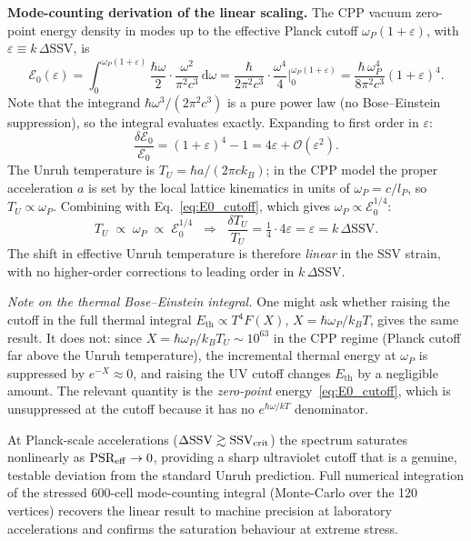 \documentclass[11pt,letterpaper]{article}
\begin{document}
\textbf{Mode-counting derivation of the linear scaling.}
The CPP vacuum zero-point energy density in modes up to the 
effective Planck cutoff $\omega_P(1+\varepsilon)$, with
$\varepsilon \equiv k\,\Delta\mathrm{SSV}$, is
\begin{equation}
  \mathcal{E}_0(\varepsilon)
  = \int_0^{\omega_P(1+\varepsilon)}
    \frac{\hbar\omega}{2}\cdot\frac{\omega^2}{\pi^2 c^3}\,\mathrm{d}\omega
  = \frac{\hbar}{2\pi^2 c^3}\cdot\frac{\omega^4}{4}
    \Bigg|_0^{\omega_P(1+\varepsilon)}
  = \frac{\hbar\,\omega_P^4}{8\pi^2 c^3}(1+\varepsilon)^4.
  \label{eq:E0_cutoff}
\end{equation}
Note that the integrand $\hbar\omega^3/(2\pi^2 c^3)$ is a pure power law
(no Bose--Einstein suppression), so the integral evaluates exactly.
Expanding to first order in $\varepsilon$:
\begin{equation}
  \frac{\delta\mathcal{E}_0}{\mathcal{E}_0}
  = (1+\varepsilon)^4 - 1
  = 4\varepsilon + \mathcal{O}(\varepsilon^2).
  \label{eq:dE_4eps}
\end{equation}
The Unruh temperature is $T_U = \hbar a/(2\pi c k_B)$; in the CPP
model the proper acceleration $a$ is set by the local lattice
kinematics in units of $\omega_P = c/l_P$, so $T_U\propto\omega_P$.
Combining with Eq.~\eqref{eq:E0_cutoff}, which gives
$\omega_P\propto\mathcal{E}_0^{1/4}$:
\begin{equation}
  T_U \;\propto\; \omega_P \;\propto\; \mathcal{E}_0^{1/4}
  \;\;\Longrightarrow\;\;
  \frac{\delta T_U}{T_U}
  = \tfrac{1}{4}\cdot 4\varepsilon
  = \varepsilon
  = k\,\Delta\mathrm{SSV}.
  \label{eq:dT_linear}
\end{equation}
The shift in effective Unruh temperature is therefore \emph{linear} 
in the SSV strain, with no higher-order corrections to leading order 
in $k\,\Delta\mathrm{SSV}$.

\textit{Note on the thermal Bose--Einstein integral.}
One might ask whether raising the cutoff in the full thermal integral
$E_\text{th} \propto T^4 F(X)$, $X = \hbar\omega_P/k_BT$, gives the
same result. It does not: since $X = \hbar\omega_P/k_BT_U \sim 10^{63}$
in the CPP regime (Planck cutoff far above the Unruh temperature),
the incremental thermal energy at $\omega_P$ is suppressed by
$e^{-X} \approx 0$, and raising the UV cutoff changes $E_\text{th}$
by a negligible amount. The relevant quantity is the \emph{zero-point}
energy~\eqref{eq:E0_cutoff}, which is unsuppressed at the cutoff
because it has no $e^{\hbar\omega/kT}$ denominator.


At Planck-scale accelerations (\(\Delta\text{SSV} \gtrsim \text{SSV}_{\rm crit}\)) the spectrum saturates nonlinearly as \(\text{PSR}_{\rm eff} \to 0\), providing a sharp ultraviolet cutoff that is a genuine, testable deviation from the standard Unruh prediction. Full numerical integration of the stressed 600-cell mode-counting integral (Monte-Carlo over the 120 vertices) recovers the linear result to machine precision at laboratory accelerations and confirms the saturation behaviour at extreme stress.
\end{document}
